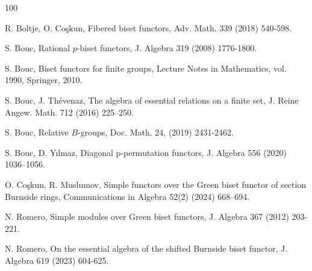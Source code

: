 \documentclass[12pt]{article}
\theoremstyle{change}
\newcommand{\1}{{\bf 1}}
\begin{document}
\begin{thebibliography}{100}

{R. Boltje, O. Co\c{s}kun}, Fibered biset functors, {Adv. Math.} 339 (2018) 540-598. 

{S. Bouc}, Rational $p$-biset functors, {J. Algebra} 319 (2008) 1776-1800.

{S. Bouc}, Biset functors for finite groups, Lecture Notes in Mathematics, vol. 1990, Springer, 2010.

{S. Bouc, J. Thévenaz}, The algebra of essential relations on a finite set, J. Reine Angew. Math. 712 (2016) 225–250.

 {S. Bouc}, Relative $B$-groups, Doc. Math. 24, (2019) 2431-2462.

{S. Bouc, D. Yılmaz}, Diagonal p-permutation functors, J. Algebra 556 (2020) 1036–1056.

{O. Co\c{s}kun, R. Muslumov}, Simple functors over the Green biset functor of section Burnside rings, {Communications in Algebra} 52(2) (2024) 668–694.

{N. Romero}, Simple modules over Green biset functors, {J. Algebra} 367 (2012) 203-221.

{N. Romero}, On the essential algebra of the shifted Burnside biset functor, {J. Algebra} 619 (2023) 604-625.

\end{thebibliography}
\end{document}
